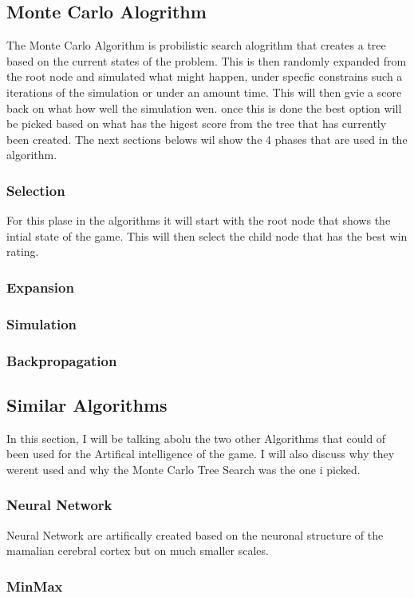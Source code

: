 \subsection {Monte Carlo Alogrithm}
The Monte Carlo Algorithm is probilistic search alogrithm that creates a tree based on the current states of the problem. This is then randomly expanded from the root node and simulated what might happen, under specfic constrains such a iterations of the simulation or under an amount time. This will then gvie a score back on what how well the simulation wen. once this is done the best option will be picked based on what has the higest score from the tree that has currently been created.  The next sections belows wil show the 4 phases that are used in the algorithm.
\subsubsection{Selection}
For this plase in the algorithms it will start with the root node that shows the intial state of the game. This will then select the child node that has the best win rating. 
\subsubsection{Expansion}
\subsubsection{Simulation}
\subsubsection{Backpropagation}
\subsection{Similar Algorithms}
In this section, I will be talking abolu the two other Algorithms that could of been used for the Artifical intelligence of the game. I will also discuss why they werent used and why the Monte Carlo Tree Search was the one i picked.
\subsubsection{Neural Network}
Neural Network are artifically created based on the neuronal structure of the mamalian cerebral cortex but on much smaller scales.\cite{NeuralNetwork}
\subsubsection{MinMax}


